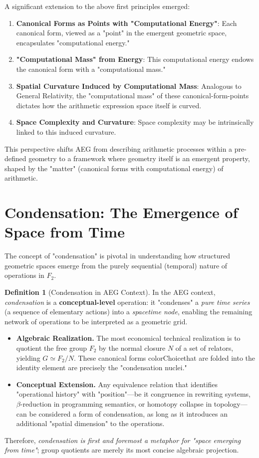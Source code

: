 \documentclass[12pt, a4paper]{article}
\theoremstyle{definition}
\newtheorem{definition}{Definition}[section]
\begin{document}
A significant extension to the above first principles emerged:

\begin{enumerate}
    \item \textbf{Canonical Forms as Points with "Computational Energy"}: Each canonical form, viewed as a "point" in the emergent geometric space, encapsulates "computational energy."
    \item \textbf{"Computational Mass" from Energy}: This computational energy endows the canonical form with a "computational mass."
    \item \textbf{Spatial Curvature Induced by Computational Mass}: Analogous to General Relativity, the "computational mass" of these canonical-form-points dictates how the arithmetic expression space itself is curved.
    \item \textbf{Space Complexity and Curvature}: Space complexity may be intrinsically linked to this induced curvature.
\end{enumerate}
This perspective shifts AEG from describing arithmetic processes within a pre-defined geometry to a framework where geometry itself is an emergent property, shaped by the "matter" (canonical forms with computational energy) of arithmetic.

\section{Condensation: The Emergence of Space from Time}

The concept of "condensation" is pivotal in understanding how structured geometric spaces emerge from the purely sequential (temporal) nature of operations in $F_2$.

\begin{definition}[Condensation in AEG Context]\label{def:condensation}
In the AEG context, \emph{condensation} is a \textbf{conceptual-level} operation: it "condenses" a \emph{pure time series} (a sequence of elementary actions) into a \emph{spacetime node}, enabling the remaining network of operations to be interpreted as a geometric grid.
\begin{itemize}
    \item \textbf{Algebraic Realization.} The most economical technical realization is to quotient the free group $F_2$ by the normal closure $N$ of a set of relators, yielding $G \simeq F_2/N$. These canonical forms colorChoicethat are folded into the identity element are precisely the "condensation nuclei."
    \item \textbf{Conceptual Extension.} Any equivalence relation that identifies "operational history" with "position"—be it congruence in rewriting systems, $\beta$-reduction in programming semantics, or homotopy collapse in topology—can be considered a form of condensation, as long as it introduces an additional "spatial dimension" to the operations.
\end{itemize}
Therefore, \emph{condensation is first and foremost a metaphor for "space emerging from time"}; group quotients are merely its most concise algebraic projection.
\end{definition}
\end{document}
